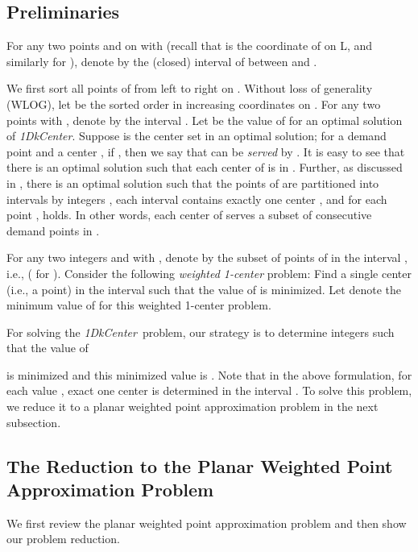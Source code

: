 \documentclass{llncs}
\def\problem{{\it 1DkCenter}}
\begin{document}
\subsection{Preliminaries}

For any two points  and  on  with  (recall
that  is the coordinate of  on L, and similarly for ), denote
by  the (closed) interval of  between  and .

We first sort all points of  from left to right on . Without loss of
generality (WLOG), let  be the sorted order in
increasing coordinates on . For any two points  with , denote by  the interval . Let
 be the value of  for an optimal solution of
\problem. Suppose  is the center set in an optimal solution;
for a demand point 
and a center , if , then we say that
 can be {\em served} by .  It is easy to see that
there is an optimal solution  such that each center of  is in
. Further, as discussed in \cite{ref:BhattacharyaOp07},
there is an optimal solution  such that the
points of  are partitioned into  intervals  by integers , each interval 
contains exactly one center , and for each point , 
holds. In other words, each center of
 serves a subset of consecutive demand points in .


For any two integers  and  with , denote
by  the subset of points of  in the interval , i.e.,
 ( for ).
Consider the following {\em weighted 1-center} problem: Find a
single center (i.e., a point)  in the interval  such that
the value of  is
minimized. Let  denote the minimum value of
 for this weighted 1-center problem.

For solving the \problem\ problem, our strategy is to determine 
integers  such that the value of

is minimized and this minimized value is . Note that
in the above formulation, for each value , exact one center is
determined in the interval . To solve this problem, we reduce
it to a planar weighted point approximation problem
\cite{ref:ChenAp091} in the next subsection.

\subsection{The Reduction to the Planar Weighted Point Approximation Problem}
\label{sec:reduction}

We first review the planar weighted point approximation problem
and then show our problem reduction.
\end{document}
